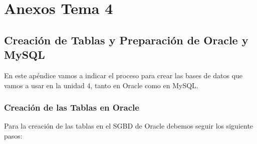 \chapter{Anexos Tema 4}

\section{Creación de Tablas y Preparación de Oracle y MySQL}
En este apéndice vamos a indicar el proceso para crear las bases de datos que vamos a usar en la unidad 4, tanto en Oracle como en MySQL.

\subsection{Creación de las Tablas en Oracle}
Para la creación de las tablas en el SGBD de Oracle debemos seguir los siguiente pasos:

